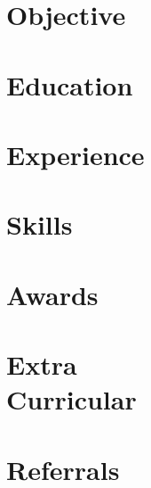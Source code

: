 \documentclass[a4paper]{resume}
\begin{document}
\def \sepspace {\vspace{1em}}
\makeheader{\contactphone}{\contactemail}{\contactwebsite}
\section{Objective}{\small \objective}
\section{Education}{\education}
\section{Experience}{\experience}
\section{Skills}{\skillstechnical}
\section{Awards}{\awards}
\section{Extra\\Curricular}{\extracurricular}
\section{Referrals}{}
\end{document}
